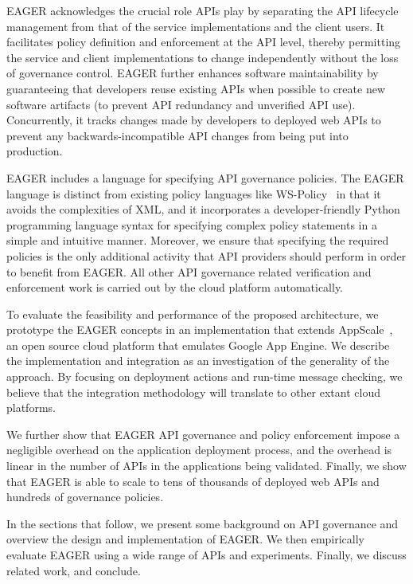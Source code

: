 EAGER acknowledges the crucial role APIs play
 by separating the API lifecycle management from that
of the service implementations and the client users.  
It facilitates policy definition and enforcement at
the API level, thereby permitting the service and client implementations to change
independently without the loss of governance control.
EAGER further enhances software maintainability by guaranteeing that 
developers reuse existing APIs when possible to create new software artifacts
(to prevent API redundancy and unverified API use). Concurrently, it
tracks changes made by developers to deployed web APIs to prevent
any backwards-incompatible API changes from being put into production.

EAGER includes a language for specifying 
API governance policies.  The EAGER language is distinct from 
existing policy languages like WS-Policy~\cite{WSPolicy,soagovstandard}
in that it avoids the complexities of XML, 
and it incorporates a developer-friendly Python programming language syntax for 
specifying complex policy statements in a simple and 
intuitive manner. Moreover, we ensure that specifying the required policies 
is the only additional activity that API providers should perform in
order to benefit from EAGER. All other API governance related verification and 
enforcement work is carried out by the cloud platform automatically.

To evaluate the feasibility and performance of the proposed 
architecture, we prototype the EAGER concepts in an implementation
that extends AppScale~\cite{appscale13}, 
an open source
cloud platform that emulates Google App Engine. We describe
the implementation and integration as an investigation of
the generality of the approach.  By focusing on deployment actions and
run-time message checking, we believe that the integration methodology
will translate to other extant cloud platforms.


We further show that 
EAGER API governance and policy enforcement impose a negligible 
overhead on the application deployment process, and the overhead
is linear in the number of APIs in the applications 
being validated.  
Finally, we show that EAGER is able to
scale to tens of thousands of deployed web APIs and hundreds of
governance policies.

In the sections that follow, we present some background on API governance
and overview the design and implementation of
EAGER. We then empirically evaluate EAGER using a wide range of APIs and
experiments.  Finally, we discuss related work, and conclude.
